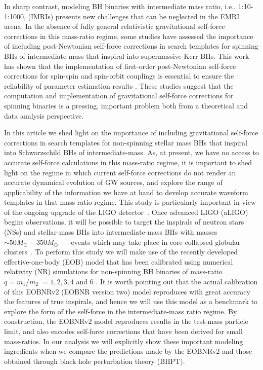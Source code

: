 In sharp contrast, modeling BH binaries with intermediate mass ratio, i.e., 1:10-1:1000, (IMRIs) presents new challenges that can be neglected in the EMRI arena.  In the absence of fully general relativistic gravitational self-force corrections in this mass-ratio regime, some studies have assessed the importance of including post-Newtonian self-force corrections in search templates for spinning BHs of intermediate-mass that inspiral into supermassive Kerr BHs. This work has shown that the implementation of first-order post-Newtonian self-force corrections for spin-spin and spin-orbit couplings is essential to ensure the reliability of parameter estimation results \cite{higherspin}.  These studies suggest that the computation and implementation of gravitational self-force corrections for spinning binaries is a pressing, important problem both from a theoretical and data analysis perspective. 

 
In this article we shed light on the importance of including gravitational self-force corrections in search templates for non-spinning stellar mass BHs that inspiral into Schwarzschild BHs of intermediate-mass. As, at present, we have no access to accurate self-force calculations in this mass-ratio regime, it is important to shed light on the regime in which current self-force corrections do not render an accurate dynamical evolution of GW sources, and explore the range of applicability of the information we have at hand to develop accurate waveform templates in that mass-ratio regime. This study is particularly important in view of the ongoing upgrade of the LIGO detector~\cite{aLIGO}. Once advanced LIGO (aLIGO) begins observations, it will be possible to target the inspirals of neutron stars (NSs) and stellar-mass BHs into intermediate-mass BHs with masses  \(\sim 50M_{\odot} - 350M_{\odot}\)~\cite{brown} ---events which may take place in core-collapsed globular clusters~\cite{evidence,firstpaper}.  To 
perform this study we will make use of the recently developed effective-one-body (EOB) model that has been calibrated using numerical relativity (NR)  simulations for non-spinning BH binaries of mass-ratio    \(q=m_1/m_2\) \(=1,2,3,4\) and 6 \cite{BuonannoEOBv2Main}. It is worth pointing out that the actual calibration of this EOBNRv2 (EOBNR version two) model reproduces with great accuracy the features of true inspirals, and hence we will use this model as a benchmark to explore the form of the self-force in the intermediate-mass ratio regime. By construction, the EOBNRv2 model reproduces results in the test-mass particle limit, and also encodes self-force corrections that have been derived for small mass-ratios. In our analysis we will explicitly show these important modeling ingredients when we compare the predictions made by the EOBNRv2 and those obtained through black hole perturbation theory (BHPT).  

